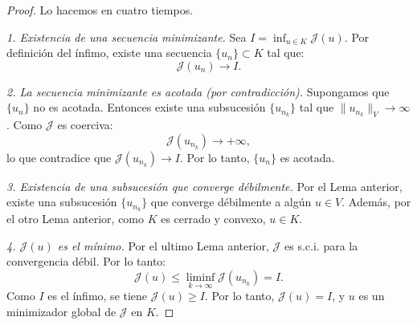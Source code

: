 \documentclass[12pt]{book}
\theoremstyle{definition}
\theoremstyle{plain}
\theoremstyle{remark}
\begin{document}
\begin{proof}
Lo hacemos en cuatro tiempos.

\noindent
\emph{1. Existencia de una secuencia minimizante.}
   Sea \(I = \inf_{u \in K} \mathcal{J}(u)\). Por definición del ínfimo, existe una secuencia \(\{u_n\} \subset K\) tal que:
   \[
   \mathcal{J}(u_n) \to I.
   \]

\medskip

\noindent \emph{2. La secuencia minimizante es acotada (por contradicción).}
   Supongamos que \(\{u_n\}\) no es acotada. Entonces existe una subsucesión \(\{u_{n_k}\}\) tal que \(\|u_{n_k}\|_V \to \infty\). Como \(\mathcal{J}\) es coerciva:
   \[
   \mathcal{J}(u_{n_k}) \to +\infty,
   \]
   lo que contradice que \(\mathcal{J}(u_{n_k}) \to I\). Por lo tanto, \(\{u_n\}\) es acotada.

\medskip

\noindent \emph{3. Existencia de una subsucesión que converge débilmente.}
   Por el Lema anterior, existe una subsucesión \(\{u_{n_k}\}\) que converge débilmente a algún \(u \in V\). Además, por el otro Lema anterior, como \(K\) es cerrado y convexo, \(u \in K\).

\medskip

\noindent \emph{4. \(\mathcal{J}(u)\) es el mínimo.}
   Por el ultimo Lema  anterior, \(\mathcal{J}\) es s.c.i. para la convergencia débil. Por lo tanto:
   \[
   \mathcal{J}(u) \leq \liminf_{k \to \infty} \mathcal{J}(u_{n_k}) = I.
   \]
   Como \(I\) es el ínfimo, se tiene \(\mathcal{J}(u) \geq I\). Por lo tanto, \(\mathcal{J}(u) = I\), y \(u\) es un minimizador global de \(\mathcal{J}\) en \(K\).
\end{proof}


%
%
%
\end{document}
